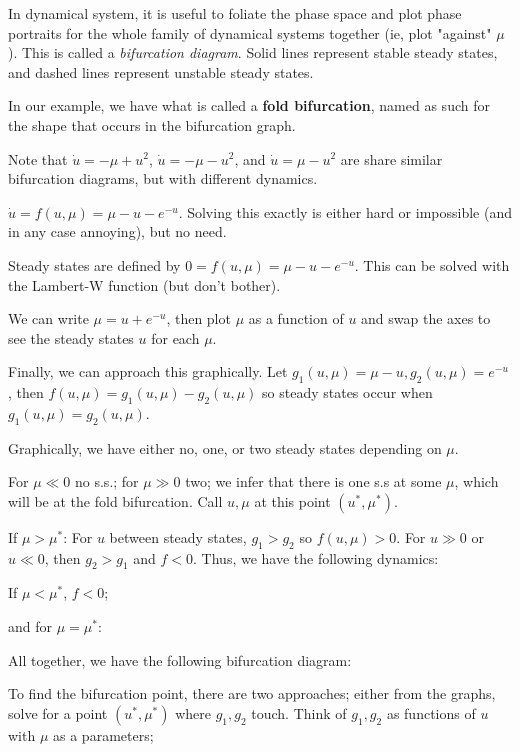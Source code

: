 \documentclass[12pt, oneside]{article}
\begin{document}
In dynamical system, it is useful to foliate the phase space and plot phase portraits for the whole family of dynamical systems together (ie, plot "against" $\mu$). This is called a \textit{bifurcation diagram}. Solid lines represent stable steady states, and dashed lines represent unstable steady states.


In our example, we have what is called a \textbf{fold bifurcation}, named as such for the shape that occurs in the bifurcation graph.

Note that $\dot{u} = -\mu + u^2$, $\dot{u} = - \mu - u^2$, and $\dot{u} = \mu - u^2$ are share similar bifurcation diagrams, but with different dynamics.

\begin{example}
  $\dot{u} = f(u, \mu) = \mu - u - e^{-u}$. Solving this exactly is either hard or impossible (and in any case annoying), but no need.

  Steady states are defined by $0 = f(u, \mu) = \mu - u - e^{-u}$. This can be solved with the Lambert-W function (but don't bother).

  We can write $\mu = u+e^{-u}$, then plot $\mu$ as a function of $u$ and swap the axes to see the steady states $u$ for each $\mu$.

  Finally, we can approach this graphically. Let $g_1(u, \mu) = \mu - u, g_2(u, \mu) = e^{-u}$, then $f(u,\mu) = g_1(u,\mu) - g_2(u,\mu)$ so steady states occur when $g_1(u, \mu) = g_2(u,\mu)$.

  Graphically, we have either no, one, or two steady states depending on $\mu$.

  For $\mu \ll 0$ no s.s.; for $\mu \gg 0$ two; we infer that there is one s.s at some $\mu$, which will be at the fold bifurcation. Call $u, \mu$ at this point $(u^*, \mu^*)$.

  If $\mu > \mu^*$:
  For $u$ between steady states, $g_1 > g_2$ so $f(u,\mu) > 0$. For $u \gg 0$ or $u \ll 0$, then $g_2>g_1$ and $f<0$. Thus, we have the 
  following dynamics:

  If $\mu < \mu^*$, $f < 0$;

  and for $\mu = \mu^*$:

  All together, we have the following bifurcation diagram:

  To find the bifurcation point, there are two approaches; either from the graphs, solve for a point $(u^*, \mu^*)$ where $g_1, g_2$ touch. Think of $g_1, g_2$ as functions of $u$ with $\mu$ as a parameters;


\end{example}
\end{document}
